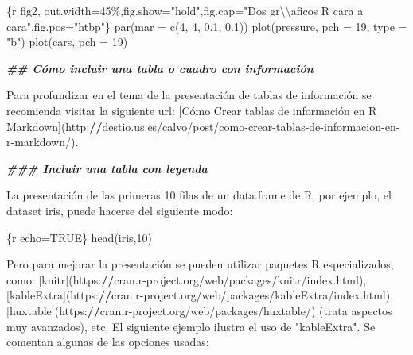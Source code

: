 \documentclass[11pt,a4paper,oneside,]{article}
\newenvironment{Shaded}{\begin{snugshade}}{\end{snugshade}}
\newcommand{\AttributeTok}[1]{\textcolor[rgb]{0.77,0.63,0.00}{#1}}
\newcommand{\DecValTok}[1]{\textcolor[rgb]{0.00,0.00,0.81}{#1}}
\newcommand{\DocumentationTok}[1]{\textcolor[rgb]{0.56,0.35,0.01}{\textbf{\textit{#1}}}}
\newcommand{\ErrorTok}[1]{\textcolor[rgb]{0.64,0.00,0.00}{\textbf{#1}}}
\newcommand{\NormalTok}[1]{#1}
\newcommand{\SpecialCharTok}[1]{\textcolor[rgb]{0.00,0.00,0.00}{#1}}
\newcommand{\StringTok}[1]{\textcolor[rgb]{0.31,0.60,0.02}{#1}}
\numberwithin{dummy}{section}
\theoremstyle{ocrenumbox}
\theoremstyle{blacknumex}
\theoremstyle{blacknumbox}
\theoremstyle{ocrenum}
\theoremstyle{ocrenum}
\begin{document}
\begin{Shaded}
\begin{Highlighting}[numbers=left,,]
\StringTok{\textasciigrave{}\textasciigrave{}\textasciigrave{}}\AttributeTok{\{r fig2, out.width=\textquotesingle{}45\%\textquotesingle{},fig.show="hold",fig.cap="Dos gr}\SpecialCharTok{\textbackslash{}\textbackslash{}}\AttributeTok{\textquotesingle{}aficos R cara a cara",fig.pos="htbp"\}}
\AttributeTok{par(mar = c(4, 4, 0.1, 0.1))}
\AttributeTok{plot(pressure, pch = 19, type = "b")}
\AttributeTok{plot(cars, pch = 19)}
\StringTok{\textasciigrave{}\textasciigrave{}\textasciigrave{}}


\DocumentationTok{\#\# Cómo incluir una tabla o cuadro con información}

\NormalTok{Para profundizar en el tema de la presentación de tablas de información se recomienda visitar la siguiente url}\SpecialCharTok{:}\NormalTok{ [Cómo Crear tablas de información en  R Markdown](http}\SpecialCharTok{:}\ErrorTok{//}\NormalTok{destio.us.es}\SpecialCharTok{/}\NormalTok{calvo}\SpecialCharTok{/}\NormalTok{post}\SpecialCharTok{/}\NormalTok{como}\SpecialCharTok{{-}}\NormalTok{crear}\SpecialCharTok{{-}}\NormalTok{tablas}\SpecialCharTok{{-}}\NormalTok{de}\SpecialCharTok{{-}}\NormalTok{informacion}\SpecialCharTok{{-}}\NormalTok{en}\SpecialCharTok{{-}}\NormalTok{r}\SpecialCharTok{{-}}\NormalTok{markdown}\SpecialCharTok{/}\NormalTok{).}


\DocumentationTok{\#\#\# Incluir una tabla con leyenda}


\NormalTok{La presentación de las primeras }\DecValTok{10}\NormalTok{ filas de un data.frame de R, por ejemplo, el dataset }\StringTok{\textasciigrave{}}\AttributeTok{iris}\StringTok{\textasciigrave{}}\NormalTok{, puede hacerse del siguiente modo}\SpecialCharTok{:}

\StringTok{\textasciigrave{}\textasciigrave{}\textasciigrave{}}\AttributeTok{\{r echo=TRUE\}}
\AttributeTok{head(iris,10)}
\StringTok{\textasciigrave{}\textasciigrave{}\textasciigrave{}}

\NormalTok{Pero para mejorar la presentación se pueden utilizar paquetes R especializados, como}\SpecialCharTok{:}\NormalTok{ [knitr](https}\SpecialCharTok{:}\ErrorTok{//}\NormalTok{cran.r}\SpecialCharTok{{-}}\NormalTok{project.org}\SpecialCharTok{/}\NormalTok{web}\SpecialCharTok{/}\NormalTok{packages}\SpecialCharTok{/}\NormalTok{knitr}\SpecialCharTok{/}\NormalTok{index.html), [kableExtra](https}\SpecialCharTok{:}\ErrorTok{//}\NormalTok{cran.r}\SpecialCharTok{{-}}\NormalTok{project.org}\SpecialCharTok{/}\NormalTok{web}\SpecialCharTok{/}\NormalTok{packages}\SpecialCharTok{/}\NormalTok{kableExtra}\SpecialCharTok{/}\NormalTok{index.html), [huxtable](https}\SpecialCharTok{:}\ErrorTok{//}\NormalTok{cran.r}\SpecialCharTok{{-}}\NormalTok{project.org}\SpecialCharTok{/}\NormalTok{web}\SpecialCharTok{/}\NormalTok{packages}\SpecialCharTok{/}\NormalTok{huxtable}\SpecialCharTok{/}\NormalTok{) (trata aspectos muy avanzados), etc. El siguiente ejemplo ilustra el uso de }\StringTok{"kableExtra"}\NormalTok{. Se comentan algunas de las opciones usadas}\SpecialCharTok{:}


\end{Highlighting}
\end{Shaded}
\end{document}
